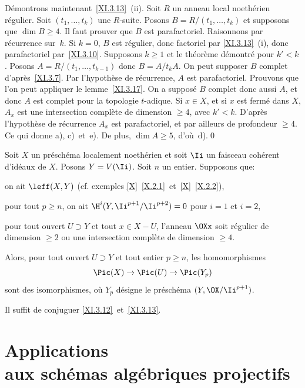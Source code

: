 D\'emontrons maintenant~\ref{XI.3.13}~(ii). Soit $R$ un anneau local noeth\'erien r\'egulier. Soit $(t_1, \ldots, t_k)$ une $R$-suite. Posons $B=R/(t_1, \ldots, t_k)$ et supposons que $\dim B\geq 4$. Il faut prouver que $B$ est parafactoriel. Raisonnons par r\'ecurrence sur~$k$. Si $k=0$, $B$ est r\'egulier, donc factoriel par \ref{XI.3.13}~(i), donc parafactoriel par~\ref{XI.3.10}. Supposons $k\geq 1$ et le th\'eor\`eme d\'emontr\'e pour $k'<k$. Posons $A=R/(t_1, \ldots, t_{k-1})$ donc $B=A/t_k A$. On peut supposer $B$ complet d'apr\`es~\ref{XI.3.7}. Par l'hypoth\`ese de r\'ecurrence, $A$ est parafactoriel. Prouvons que l'on peut appliquer le lemme~\ref{XI.3.17}. On a suppos\'e $B$ complet donc aussi $A$, et donc $A$ est complet pour la topologie $t$-adique. Si $x\in X$, et si $x$ est ferm\'e dans $X$, $A_x$ est une intersection compl\`ete de dimension $\geq 4$, avec $k'<k$. D'apr\`es l'hypoth\`ese de r\'ecurrence $A_x$ est parafactoriel, et par ailleurs de profondeur $\geq 4$. Ce qui donne a), c)~et~e). De plus, $\dim A\geq 5$, d'o\`u~d).\qed

\begin{theoreme} \label{XI.3.18}
Soit $X$ un pr\'esch\'ema localement noeth\'erien et soit $\Ii$ un faisceau coh\'erent d'id\'eaux de $X$. Posons $Y=V(\Ii)$. Soit $n$ un entier. Supposons que:
\begin{enumeratei}
\item
on ait $\leff(X, Y)$ (cf. exemples \ref{X}~\ref{X.2.1}~et~\ref{X}~\ref{X.2.2}),
\item
pour tout $p\geq n$, on ait $\H^i(Y, \Ii^{p+1}/\Ii^{p+2})=0$ pour $i=1$ et $i=2$,
\item
pour tout ouvert $U\supset Y$ et tout $x\in X-U$, l'anneau $\OXx$ soit r\'egulier de dimension $\geq 2$ ou une intersection compl\`ete de dimension $\geq 4$.
\end{enumeratei}
\noindent
Alors, pour tout ouvert $U\supset Y$ et tout entier $p\geq n$, les homomorphismes
\[
\Pic(X)\to\Pic(U)\to\Pic(Y_p)
\]
sont des isomorphismes, o\`u $Y_p$ d\'esigne le pr\'esch\'ema $(Y, \OX/\Ii^{p+1})$.
\end{theoreme}

Il suffit de conjuguer \ref{XI.3.12}~et~\ref{XI.3.13}.

\chapter[Applications aux sch\'emas alg\'ebriques projectifs]
{Applications\\ aux sch\'emas alg\'ebriques projectifs} \label{XII}

